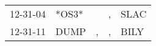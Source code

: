 \begin{supertabular}{lllll}
 12-31-04 &  *OS3* &    &  , &  SLAC \\
 12-31-11 &   DUMP &  , &  , &  BILY \\
\end{supertabular}

